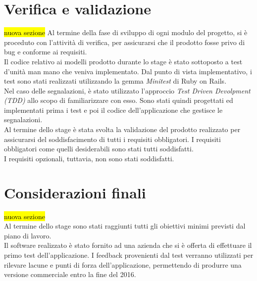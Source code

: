 \newpage
\section{Verifica e validazione}
	\hl{nuova sezione}	
	Al termine della fase di sviluppo di ogni modulo del progetto, si è proceduto con l'attività di verifica, per assicurarsi che il prodotto fosse privo di bug e conforme ai requisiti.\\
	Il codice relativo ai modelli prodotto durante lo stage è stato sottoposto a test d'unità man mano che veniva implementato. Dal punto di vista implementativo, i test sono stati realizzati utilizzando la gemma \textit{Minitest} di Ruby on Rails.\\
	Nel caso delle segnalazioni, è stato utilizzato l'approccio \textit{Test Driven Devolpment (TDD)} allo scopo di familiarizzare con esso. Sono stati quindi progettati ed implementati prima i test e poi il codice dell'applicazione che gestisce le segnalazioni.\\
	Al termine dello stage è stata svolta la validazione del prodotto realizzato per assicurarsi del soddisfacimento di tutti i requisiti obbligatori. I requisiti obbligatori come quelli desiderabili sono stati tutti soddisfatti.\\
	I requisiti opzionali, tuttavia,  non sono stati soddisfatti. 
	
	
	
\newpage
\section{Considerazioni finali}
\hl{nuova sezione}\\
	Al termine dello stage sono stati raggiunti tutti gli obiettivi minimi previsti dal piano di lavoro.\\
	Il software realizzato è stato fornito ad una azienda che si è offerta di effettuare il primo test dell'applicazione. I feedback provenienti dal test verranno utilizzati per rilevare lacune e punti di forza dell'applicazione, permettendo di produrre una versione commerciale entro la fine del 2016.
	
